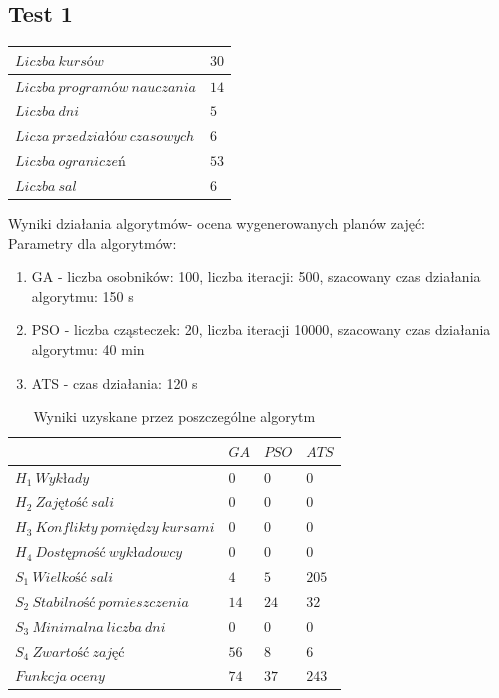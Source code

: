 \subsection{Test 1}
\begin{table}[H]
\begin{center}
 
\begin{tabular}{ |l|l| }
\hline
$Liczba\ kursów$ & $30$\\
\hline
$Liczba\ programów\ nauczania$ & $14$\\
\hline
$Liczba\ dni$ & $5$ \\
\hline
$Licza\ przedziałów\ czasowych$ & $6$ \\
\hline
$Liczba\ ograniczeń$ & $53$ \\
\hline
$Liczba\ sal$ & $6$ \\
\hline
\end{tabular}
\end{center}
\end{table}
\par Wyniki działania algorytmów- ocena wygenerowanych planów zajęć: \\
Parametry dla algorytmów:
\begin{enumerate}
\item GA - liczba osobników: 100, liczba iteracji: 500, szacowany czas działania algorytmu: 150 s
\item PSO - liczba cząsteczek: 20, liczba iteracji 10000, szacowany czas działania algorytmu: 40 min
\item ATS - czas działania: 120 s
\end{enumerate}
\begin{table}[H]
\begin{center}

\begin{tabular}{ |l|l|l|l| }
\hline
 & $GA$ & $PSO$ & $ATS$\\
\hline
${H}_{1}\ Wykłady$ & $0$ & $0$ & $0$\\
\hline
$H_{2}\ Zajętość\ sali$ & $0$ & $0$ & $0$\\
\hline
$H_{3}\ Konflikty\ pomiędzy\ kursami$ & $0$ & $0$ & $0$ \\
\hline
$H_{4}\ Dostępność\ wykładowcy$ & $0$ & $0$ & $0$ \\
\hline
$S_{1}\ Wielkość\ sali$ & $4$ & $5$ & $205$ \\
\hline
$S_{2}\ Stabilność\ pomieszczenia$ & $14$ & $24$ & $32$ \\
\hline
$S_{3}\ Minimalna\ liczba\ dni$ & $0$ & $0$ & $0$ \\
\hline
$S_{4}\ Zwartość\ zajęć$ & $56$ & $8$ & $6$ \\
\hline
$Funkcja\ oceny$ & $74$ & $37$ & $243$ \\
\hline
\end{tabular}
\end{center}
\caption {Wyniki uzyskane przez poszczególne algorytm}
\end{table}
